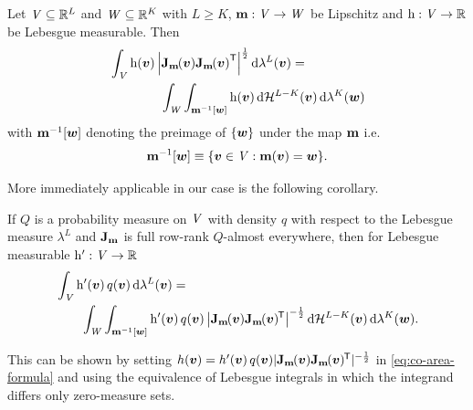 \begin{theorem}
Let $\mathit{V} \subseteq \mathbb{R}^L$ and $\mathit{W} \subseteq \mathbb{R}^K$ with $L \geq K$, ${\mathbf{m}}:\mathit{V}\to\mathit{W}$ be Lipschitz and $\mathrm{h} : \mathit{V} \to \mathbb{R}$ be Lebesgue measurable. Then
\begin{equation}\label{eq:co-area-formula}
\begin{split}
    &\int_{\set{V}} 
      \func{h}(\vct{v}) \, \left|\jacob{\vctfunc{m}}{\vct{v}}\jacob{\vctfunc{m}}{\vct{v}}^{\mathsf{T}}\right|^{\frac{1}{2}}
    \,\dr\lebm{L}(\vct{v})
    = \,\\
    &\qquad\qquad
    \int_{\set{W}}
      \int_{\preimage{\vctfunc{m}}{\vct{w}}} \func{h}(\vct{v}) \,\dr\haum{L-K}(\vct{v})
    \,\dr\lebm{K}(\vct{w})
\end{split}
\end{equation}
with ${\mathbf{m}}^{-1}[\boldsymbol{w}]$ denoting the preimage of $\lbrace \boldsymbol{w} \rbrace$ under the map ${\mathbf{m}}$ i.e. 
\begin{equation}\label{eq:preimage-notation-definition}
  \preimage{\vctfunc{m}}{\vct{w}} \equiv 
  \fset{\vct{v} \in \set V : \vctfunc{m}(\vct{v}) = \vct{w}}.
\end{equation}
\end{theorem}
More immediately applicable in our case is the following corollary.
\begin{corollary}
If $Q$ is a probability measure on $\mathit{V}$ with density $q$ with respect to the Lebesgue measure $\lambda^L$ and $\mathbf{J}_{{\mathbf{m}}}$ is full row-rank $Q$-almost everywhere, then for Lebesgue measurable $\mathrm{h}' : \mathit{V} \to \mathbb{R}$
\begin{equation}\label{eq:co-area-formula-corollary}
\begin{split}
    &\int_{\set{V}} 
      \func{h}'(\vct{v})\,q(\vct{v})
    \,\dr\lebm{L}(\vct{v})
    =\,\\
    &\qquad
    \int_{\set{W}}
      \int_{\preimage{\vctfunc{m}}{\vct{w}}}
        \func{h}'(\vct{v}) \,
        q(\vct{v})\,
        \left|\jacob{\vctfunc{m}}{\vct{v}}\jacob{\vctfunc{m}}{\vct{v}}\phantom{}\tr\right|^{-\frac{1}{2}}
      \,\dr\haum{L-K}(\vct{v})
    \,\dr\lebm{K}(\vct{w}).
\end{split}
\end{equation}
\end{corollary}
This can be shown by setting $h(\vct{v}) = h'(\vct{v})\,q(\vct{v})|\jacob{\vctfunc{m}}{\vct{v}}\jacob{\vctfunc{m}}{\vct{v}}\phantom{}\tr|^{-\frac{1}{2}}$ in \eqref{eq:co-area-formula} and using the equivalence of Lebesgue integrals in which the integrand differs only zero-measure sets. 

